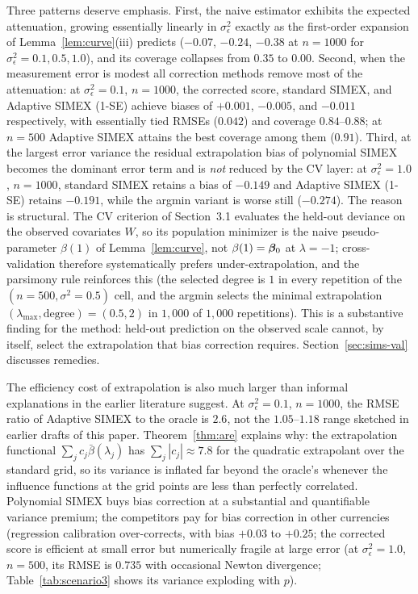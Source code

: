 Three patterns deserve emphasis. First, the naive estimator exhibits
the expected attenuation, growing essentially linearly in
$\sigma^2_\epsilon$ exactly as the first-order expansion of
Lemma~\ref{lem:curve}(iii) predicts ($-0.07$, $-0.24$, $-0.38$ at
$n=1000$ for $\sigma^2_\epsilon=0.1,0.5,1.0$), and its coverage
collapses from $0.35$ to $0.00$. Second, when the measurement error is
modest all correction methods remove most of the attenuation: at
$\sigma^2_\epsilon=0.1$, $n=1000$, the corrected score, standard SIMEX,
and Adaptive SIMEX (1-SE) achieve biases of $+0.001$, $-0.005$, and
$-0.011$ respectively, with essentially tied RMSEs ($0.042$) and
coverage $0.84$--$0.88$; at $n=500$ Adaptive SIMEX attains the best
coverage among them ($0.91$). Third, at the largest error variance the
residual extrapolation bias of polynomial SIMEX becomes the dominant
error term and is \emph{not} reduced by the CV layer: at
$\sigma^2_\epsilon=1.0$, $n=1000$, standard SIMEX retains a bias of
$-0.149$ and Adaptive SIMEX (1-SE) retains $-0.191$, while the argmin
variant is worse still ($-0.274$). The reason is structural. The CV
criterion of Section~3.1 evaluates the held-out deviance on the
observed covariates $W$, so its population minimizer is the naive
pseudo-parameter $\beta(1)$ of Lemma~\ref{lem:curve}, not
$\beta(1)=\bm{\beta}_0$ at $\lambda=-1$; cross-validation therefore
systematically prefers under-extrapolation, and the parsimony rule
reinforces this (the selected degree is $1$ in every repetition of the
$(n{=}500,\sigma^2{=}0.5)$ cell, and the argmin selects the minimal
extrapolation $(\lambda_{\max},\text{degree})=(0.5,2)$ in $1{,}000$ of
$1{,}000$ repetitions). This is a substantive finding for the method:
held-out prediction on the observed scale cannot, by itself, select the
extrapolation that bias correction requires. Section~\ref{sec:sims-val}
discusses remedies.

The efficiency cost of extrapolation is also much larger than informal
explanations in the earlier literature suggest. At
$\sigma^2_\epsilon=0.1$, $n=1000$, the RMSE ratio of Adaptive SIMEX to
the oracle is $2.6$, not the $1.05$--$1.18$ range sketched in earlier
drafts of this paper. Theorem~\ref{thm:are} explains why: the
extrapolation functional $\sum_jc_j\bar\beta(\lambda_j)$ has
$\sum_j|c_j|\approx7.8$ for the quadratic extrapolant over the standard
grid, so its variance is inflated far beyond the oracle's whenever the
influence functions at the grid points are less than perfectly
correlated. Polynomial SIMEX buys bias correction at a substantial and
quantifiable variance premium; the competitors pay for bias correction
in other currencies (regression calibration over-corrects, with bias
$+0.03$ to $+0.25$; the corrected score is efficient at small error
but numerically fragile at large error (at
$\sigma^2_\epsilon=1.0$, $n=500$, its RMSE is $0.735$ with occasional
Newton divergence; Table~\ref{tab:scenario3} shows its variance
exploding with $p$).

